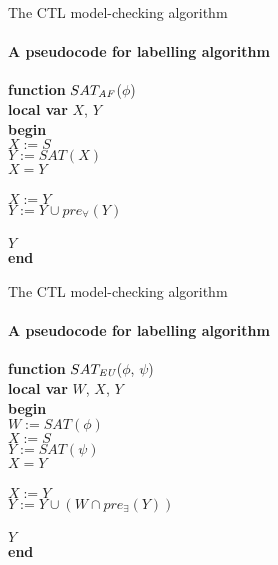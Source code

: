 \begin{frame}{The CTL model-checking algorithm}
	\framesubtitle{A pseudocode for labelling algorithm}
	
	{\bf function} $SAT_{\textit{A}\textit{F}}$($\phi$)\\
	{\bf local var} $X$, $Y$\\
	{\bf begin}\\
	\qquad $X := S$\\
	\qquad $Y := SAT(X)$\\
	 $X = Y$\\
	\\
	\qquad\qquad $X := Y$\\
	\qquad\qquad $Y := Y \cup pre_{\forall}(Y)$\\
	\\
	 $Y$\\
	{\bf end}
\end{frame}

\begin{frame}{The CTL model-checking algorithm}
	\framesubtitle{A pseudocode for labelling algorithm}
	
	{\bf function} $SAT_{\textit{E}\textit{U}}$($\phi$, $\psi$)\\
	{\bf local var} $W$, $X$, $Y$\\
	{\bf begin}\\
	\qquad $W := SAT(\phi)$\\
	\qquad $X := S$\\
	\qquad $Y := SAT(\psi)$\\
	 $X = Y$\\
	\\
	\qquad\qquad $X := Y$\\
	\qquad\qquad $Y := Y \cup (W \cap pre_{\exists}(Y))$\\
	\\
	 $Y$\\
	{\bf end}
\end{frame}